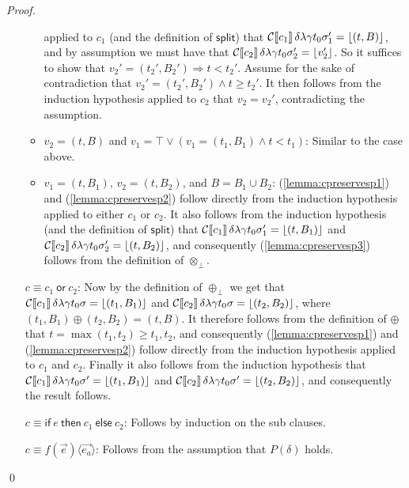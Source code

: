 \documentclass[orivec,final]{llncs-href}
\newcommand{\tracesplit}{\mathsf{split}}
\newcommand{\lift}[1]{\lfloor #1 \rfloor}
\newcommand{\trace}{\sigma}
\newcommand{\conforming}{\top}
\newcommand{\cor}[2]{#1\ \mathsf{or}\ #2}
\newcommand{\cifthenelse}[3]{\mathsf{if}\ #1\ \mathsf{then}\ #2\
  \mathsf{else}\ #3}
\newcommand{\cinstantiate}[3]{#1(#2)\langle#3\rangle}
\newcommand{\cordefault}{\cor{c_1}{c_2}}
\newcommand{\cifthenelsedefault}{\cifthenelse{e}{c_1}{c_2}}
\newcommand{\cinstantiatedefault}{\cinstantiate{f}{\vec{e}}{\vec{e_a}}}
\begin{document}
\begin{proof}
\begin{itemize}
\begin{itemize}
      applied to $c_1$ (and the definition of $\tracesplit$) that
      $\cdenclause{c_1}{\delta}{\lambda}{\gamma}{t_0}{\trace'_1} =
      \lift{(t,B)}$, and by assumption we must have that
      $\cdenclause{c_2}{\delta}{\lambda}{\gamma}{t_0}{\trace'_2} =
      \lift{v_2'}$. So it suffices to show that $v_2' = (t_2',B_2')
      \Rightarrow t < t_2'$. Assume for the sake
      of contradiction that $v_2' = (t_2',B_2') \land t \geq
      t_2'$. It then follows from the induction hypothesis applied to
      $c_2$ that $v_2 = v_2'$, contradicting the assumption.
    \item $v_2 = (t,B)$ and $v_1 = \conforming \lor (v_1 = (t_1,B_1)
      \land t < t_1)$: Similar to the case above.
    \item $v_1 = (t,B_1)$, $v_2 = (t,B_2)$, and $B = B_1 \cup B_2$:
      (\ref{lemma:cpreservesp1}) and 
      (\ref{lemma:cpreservesp2}) follow directly from the
      induction hypothesis applied to either $c_1$ or $c_2$. It also
      follows from the induction hypothesis (and the definition of
      $\tracesplit$) that
      $\cdenclause{c_1}{\delta}{\lambda}{\gamma}{t_0}{\trace'_1} =
      \lift{(t,B_1)}$
      and $\cdenclause{c_2}{\delta}{\lambda}{\gamma}{t_0}{\trace'_2} =
      \lift{(t,B_2)}$, and consequently (\ref{lemma:cpreservesp3})
      follows from the definition of $\otimes_\bot$.
    \end{itemize}
  \item[$c \equiv \cordefault$:]
    Now by the definition of $\oplus_\bot$ we get that
    $\cdenclause{c_1}{\delta}{\lambda}{\gamma}{t_0}{\trace} =
    \lift{(t_1,B_1)}$ and
    $\cdenclause{c_2}{\delta}{\lambda}{\gamma}{t_0}{\trace} = 
    \lift{(t_2,B_2)}$, where $(t_1,B_1) \oplus (t_2,B_2) = (t,B)$. It
    therefore follows from the definition of $\oplus$ that $t =
    \max(t_1,t_2) \geq t_1,t_2$, and 
    consequently (\ref{lemma:cpreservesp1}) and
    (\ref{lemma:cpreservesp2}) follow directly from the induction
    hypothesis applied to $c_1$ and $c_2$. Finally it also follows
    from the induction hypothesis that 
    $\cdenclause{c_1}{\delta}{\lambda}{\gamma}{t_0}{\trace'} = 
    \lift{(t_1,B_1)}$ and
    $\cdenclause{c_2}{\delta}{\lambda}{\gamma}{t_0}{\trace'} =
    \lift{(t_2,B_2)}$, and consequently the result follows.
  \item[$c \equiv \cifthenelsedefault$:]
    Follows by induction on the sub clauses.
  \item[$c \equiv \cinstantiatedefault$:]
    Follows from the assumption that $P(\delta)$ holds.
  \end{itemize}
  \qed
\end{proof}
\end{document}
